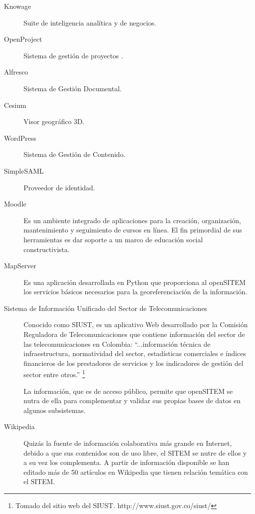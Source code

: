 \begin{description}

\item[Knowage] Suite de inteligencia analítica y de negocios\cite{engineering2017}.

\item[OpenProject] Sistema de gestión de proyectos\cite{openproject2017} .

\item[Alfresco] Sistema de Gestión Documental.

\item[Cesium] Visor geográfico 3D.

\item[WordPress] Sistema de Gestión de Contenido.

\item[SimpleSAML] Proveedor de identidad.

 \item[Moodle] Es un ambiente integrado de aplicaciones para la creación, organización, mantenimiento y seguimiento de cursos en línea. El fin primordial de sus herramientas es dar soporte a un marco de educación social constructivista.

\item[MapServer] Es una aplicación desarrollada en Python que proporciona al openSITEM los servicios básicos necesarios para la georeferenciación de la información.

\item[Sistema de Información Unificado del Sector de Telecomunicaciones] Conocido como SIUST, es un aplicativo Web desarrollado por la Comisión Reguladora de Telecomunicaciones que contiene información del sector de las telecomunicaciones en Colombia: “...información técnica de infraestructura, normatividad del sector, estadísticas comerciales e índices financieros de los prestadores de servicios y los indicadores de gestión del sector entre otros.” \footnote{Tomado del sitio web del SIUST. http://www.siust.gov.co/siust/}

La información, que es de acceso público, permite que openSITEM se nutra de ella para complementar y validar sus propias bases de datos en algunos subsistemas.

\item[Wikipedia] Quizás la fuente de información colaborativa más grande en Internet, debido a que sus contenidos son de uso libre, el SITEM se nutre de ellos y a su vez los complementa. A partir de información disponible se han editado más de 50 artículos en Wikipedia que tienen relación temática con el SITEM.

 \end{description}

